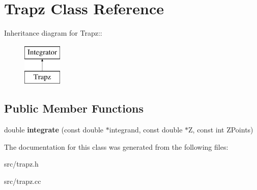 \hypertarget{classTrapz}{
\section{Trapz Class Reference}
\label{d8/da8/classTrapz}
}
Inheritance diagram for Trapz::\begin{figure}[H]
\begin{center}
\leavevmode
\includegraphics[height=2cm]{d8/da8/classTrapz}
\end{center}
\end{figure}
\subsection*{Public Member Functions}
\begin{DoxyCompactItemize}
\item 
\hypertarget{classTrapz_a8aee327ed631f75ef3dea7e458f71cca}{
double {\bfseries integrate} (const double $\ast$integrand, const double $\ast$Z, const int ZPoints)}
\label{d8/da8/classTrapz_a8aee327ed631f75ef3dea7e458f71cca}

\end{DoxyCompactItemize}


The documentation for this class was generated from the following files:\begin{DoxyCompactItemize}
\item 
src/trapz.h\item 
src/trapz.cc\end{DoxyCompactItemize}
